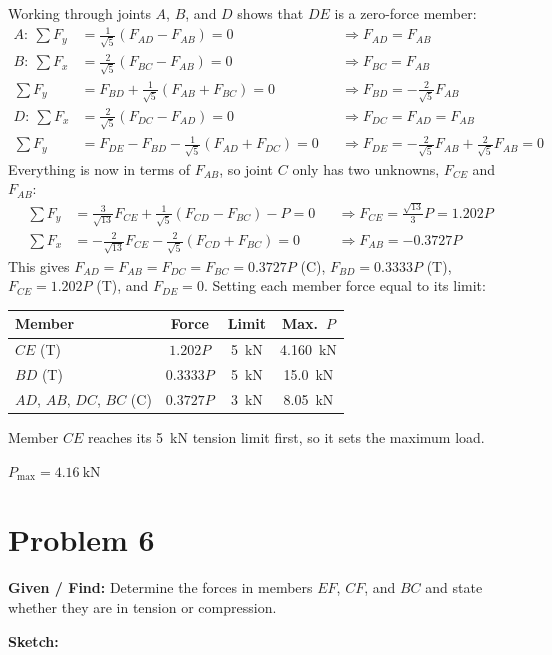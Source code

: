 \documentclass[11pt]{article}
\newcommand{\problemstart}[2]{%
    \clearpage
    \setlength{\parskip}{0.5\baselineskip}
    \setlength{\abovedisplayskip}{4pt}\setlength{\belowdisplayskip}{4pt}
    \section*{Problem #1}
    \textbf{Given / Find:} #2

    \textbf{Sketch:}
}
\begin{document}
Working through joints $A$, $B$, and $D$ shows that $DE$ is a zero-force member:
\begin{align*}
A:\ \textstyle\sum F_y&=\tfrac{1}{\sqrt5}(F_{AD}-F_{AB})=0 &&\Rightarrow F_{AD}=F_{AB}\\
B:\ \textstyle\sum F_x&=\tfrac{2}{\sqrt5}(F_{BC}-F_{AB})=0 &&\Rightarrow F_{BC}=F_{AB}\\
\textstyle\sum F_y&=F_{BD}+\tfrac{1}{\sqrt5}(F_{AB}+F_{BC})=0 &&\Rightarrow F_{BD}=-\tfrac{2}{\sqrt5}F_{AB}\\
D:\ \textstyle\sum F_x&=\tfrac{2}{\sqrt5}(F_{DC}-F_{AD})=0 &&\Rightarrow F_{DC}=F_{AD}=F_{AB}\\
\textstyle\sum F_y&=F_{DE}-F_{BD}-\tfrac{1}{\sqrt5}(F_{AD}+F_{DC})=0 &&\Rightarrow F_{DE}=-\tfrac{2}{\sqrt5}F_{AB}+\tfrac{2}{\sqrt5}F_{AB}=0
\end{align*}
Everything is now in terms of $F_{AB}$, so joint $C$ only has two unknowns, $F_{CE}$ and $F_{AB}$:
\begin{align*}
\textstyle\sum F_y&=\tfrac{3}{\sqrt{13}}F_{CE}+\tfrac{1}{\sqrt5}(F_{CD}-F_{BC})-P=0 &&\Rightarrow F_{CE}=\tfrac{\sqrt{13}}{3}P=1.202P\\
\textstyle\sum F_x&=-\tfrac{2}{\sqrt{13}}F_{CE}-\tfrac{2}{\sqrt5}(F_{CD}+F_{BC})=0 &&\Rightarrow F_{AB}=-0.3727P
\end{align*}
This gives $F_{AD}=F_{AB}=F_{DC}=F_{BC}=0.3727P$ (C), $F_{BD}=0.3333P$ (T), $F_{CE}=1.202P$ (T), and $F_{DE}=0$. Setting each member force equal to its limit:
\begin{center}
\begin{tabular}{lccc}
\toprule
\textbf{Member} & \textbf{Force} & \textbf{Limit} & \textbf{Max.\ $P$} \\
\midrule
$CE$ (T) & $1.202P$ & \SI{5}{\kN} & \SI{4.160}{\kN}\\
$BD$ (T) & $0.3333P$ & \SI{5}{\kN} & \SI{15.0}{\kN}\\
$AD$, $AB$, $DC$, $BC$ (C) & $0.3727P$ & \SI{3}{\kN} & \SI{8.05}{\kN}\\
\bottomrule
\end{tabular}
\end{center}

Member $CE$ reaches its \SI{5}{\kN} tension limit first, so it sets the maximum load.

\begin{finalanswer}
$P_{\max}=\SI{4.16}{\kN}$
\end{finalanswer}

\problemstart{6}{Determine the forces in members $EF$, $CF$, and $BC$ and state whether they are in tension or compression.}
\end{document}

